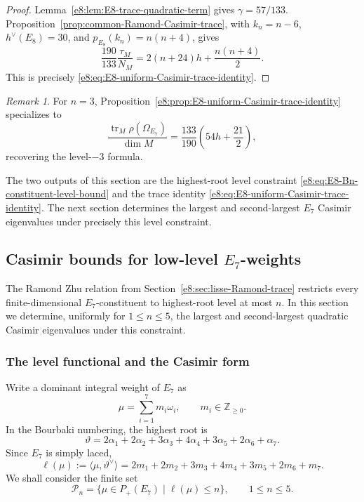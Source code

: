 \documentclass[11pt,reqno]{amsart}
\theoremstyle{definition}
\theoremstyle{remark}
\newtheorem{remark}[theorem]{Remark}
\providecommand{\Z}{\mathbb{Z}}
\providecommand{\tr}{\operatorname{tr}}
\begin{document}
\begin{proof}
Lemma~\ref{e8:lem:E8-trace-quadratic-term} gives
$\gamma=57/133$.  Proposition~\ref{prop:common-Ramond-Casimir-trace},
with $k_n=n-6$, $h^\vee(E_8)=30$, and
$p_{E_8}(k_n)=n(n+4)$, gives
\[
 \frac{190}{133}\frac{\tau_M}{N_M}
 =2(n+24)h+\frac{n(n+4)}2.
\]
This is precisely \eqref{e8:eq:E8-uniform-Casimir-trace-identity}.
\end{proof}

\begin{remark}

For $n=3$, Proposition~\ref{e8:prop:E8-uniform-Casimir-trace-identity}
specializes to
\begin{equation*}
  \frac{\tr_M\rho(\Omega_{E_7})}{\dim M}
  =\frac{133}{190}\left(54h+\frac{21}{2}\right),
\end{equation*}
recovering the level-$-3$ formula.
\end{remark}

The two outputs of this section are the highest-root level constraint
\eqref{e8:eq:E8-Bn-constituent-level-bound} and the trace identity
\eqref{e8:eq:E8-uniform-Casimir-trace-identity}.  The next section determines
the largest and second-largest $E_7$ Casimir eigenvalues under precisely this
level constraint.

\subsection{Casimir bounds for low-level \texorpdfstring{$E_{7}$}{E7}-weights}
\label{e8:sec:E8-E7-Casimir-bounds}

The Ramond Zhu relation from Section~\ref{e8:sec:lisse-Ramond-trace}
restricts every finite-dimensional $E_7$-constituent to highest-root level
at most $n$.  In this section we determine, uniformly for $1\le n\le5$,
the largest and second-largest quadratic Casimir eigenvalues under this
constraint.

\subsubsection{The level functional and the Casimir form}


Write a dominant integral weight of $E_7$ as
\begin{equation*}
  \mu=\sum_{i=1}^{7}m_i\omega_i,
  \qquad m_i\in\Z_{\ge0}.
\end{equation*}
In the Bourbaki numbering, the highest root is
\begin{equation}
  \vartheta
  =2\alpha_1+2\alpha_2+3\alpha_3+4\alpha_4
   +3\alpha_5+2\alpha_6+\alpha_7.
  \label{e8:eq:E8-E7-highest-root-expansion}
\end{equation}
Since $E_7$ is simply laced,
\begin{equation}
  \ell(\mu)
  :=\langle\mu,\vartheta^\vee\rangle
  =2m_1+2m_2+3m_3+4m_4+3m_5+2m_6+m_7.
  \label{e8:eq:E8-E7-level-functional}
\end{equation}
We shall consider the finite set
\begin{equation*}
  \mathcal P_n
  =\{\mu\in P_+(E_7)\mid \ell(\mu)\le n\},
  \qquad 1\le n\le5.
\end{equation*}
\end{document}
